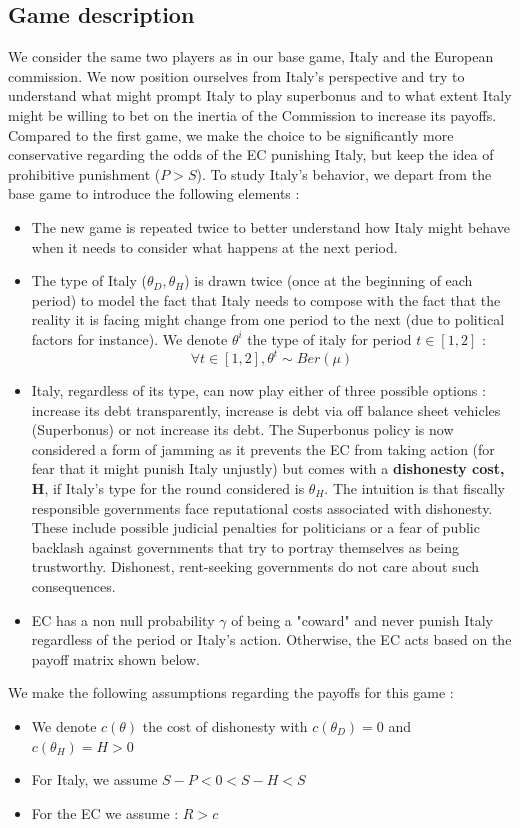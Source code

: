 \documentclass{article}
\begin{document}
\subsection{Game description}
We consider the same two players as in our base game, Italy and the European commission. We now position ourselves from Italy's perspective and try to understand what might prompt Italy to play superbonus and to what extent Italy might be willing to bet on the inertia of the Commission to increase its payoffs. Compared to the first game, we make the choice to be significantly more conservative regarding the odds of the EC punishing Italy, but keep the idea of prohibitive punishment ($P>S$). To study Italy's behavior, we depart from the base game to introduce the following elements : 
\begin{itemize}
    \item The new game is repeated twice to better understand how Italy might behave when it needs to consider what happens at the next period. 
    \item The type of Italy ($\theta_D,\theta_H$) is drawn twice (once at the beginning of each period) to model the fact that Italy needs to compose with the fact that the reality it is facing might change from one period to the next (due to political factors for instance). We denote $\theta^i$ the type of italy for period $t\in[1,2]$ : 
    \begin{equation}
        \forall t\in[1,2], \theta^t\sim Ber(\mu)
    \end{equation}

    \item Italy, regardless of its type, can now play either of three possible options : increase its debt transparently, increase is debt via off balance sheet vehicles (Superbonus) or not increase its debt. The Superbonus policy is now considered a form of jamming as it prevents the EC from taking action (for fear that it might punish Italy unjustly) but comes with a \textbf{dishonesty cost, H}, if Italy's type for the round considered is $\theta_H$. The intuition is that fiscally responsible governments face reputational costs associated with dishonesty. These include possible judicial penalties for politicians or a fear of public backlash against governments that try to portray themselves as being trustworthy. Dishonest, rent-seeking governments do not care about such consequences.
    
    \item EC has a non null probability $\gamma$ of being a "coward" and never punish Italy regardless of the period or Italy's action. Otherwise, the EC acts based on the payoff matrix shown below. 
\end{itemize}
We make the following assumptions regarding the payoffs for this game : 
\begin{itemize}
    \item We denote $c(\theta)$ the cost of dishonesty with $c(\theta_D)=0$ and $c(\theta_H)=H>0$
    \item For Italy, we assume $S-P<0<S-H<S$
    \item For the EC we assume : $R>c$
\end{itemize}
\end{document}
